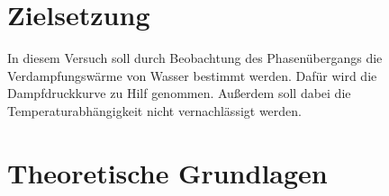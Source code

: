 \section{Zielsetzung}

In diesem Versuch soll durch Beobachtung des Phasenübergangs die 
Verdampfungswärme von Wasser bestimmt werden. Dafür wird die Dampfdruckkurve zu Hilf genommen. Außerdem soll dabei die Temperaturabhängigkeit nicht vernachlässigt werden.

\section{Theoretische Grundlagen}


